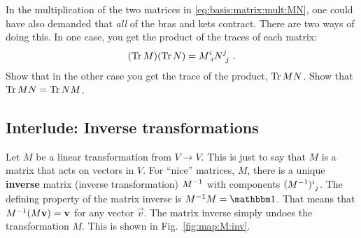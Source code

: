\documentclass[12pt, oneside]{report}    %
\begin{document}
\begin{exercise}\label{eq:matrix:product:trace}
In the multiplication of the two matrices in \eqref{eq:basis:matrix:mult:MN}, one could have also demanded that \emph{all} of the bras and kets contract. There are two ways of doing this. In one case, you get the product of the traces of each matrix:
\begin{align}
    (\Tr{M})(\Tr{N}) = M\aij{i}{i} N\aij{j}{j} \ .
\end{align}
Show that in the other case you get the trace of the product, $\operatorname{\textnormal{Tr}}{MN}$. Show that $\operatorname{\textnormal{Tr}}{MN} = \operatorname{\textnormal{Tr}}{NM}$.
\end{exercise}



\subsection{Interlude: Inverse transformations}

Let $M$ be a linear transformation from $V\to V$. This is just to say that $M$ is a matrix that acts on vectors in $V$. For ``nice'' matrices, $M$, there is a unique \textbf{inverse} matrix (inverse transformation) $M^{-1}$ with components $(M\inv)\aij{i}{j}$. The defining property of the matrix inverse is $M\inv M = \one $. That means that $M^{-1}(M\mathbf{v})=\mathbf{v}$ for any vector $\vec{v}$. The matrix inverse simply undoes the transformation $M$. This is shown in Fig.~\ref{fig:map:M:inv}. 

\end{document}
